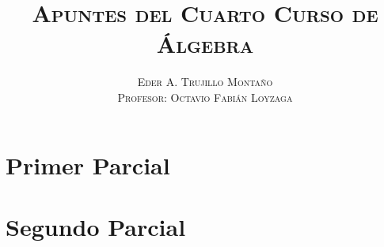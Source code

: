 \documentclass[a6paper]{book}
\title{\textsc{Apuntes del Cuarto Curso de Álgebra \vspace{3mm}
\vspace{1cm}}}
\author{\textsc{Eder A. Trujillo Montaño} \\
		\textsc{Profesor: Octavio Fabián Loyzaga} \vspace{1cm}}
\theoremstyle{definition}
\theoremstyle{plain}
\begin{document}
\maketitle
\onehalfspace
    \section{Primer Parcial}
    
    \section{Segundo Parcial}
    
\end{document}
